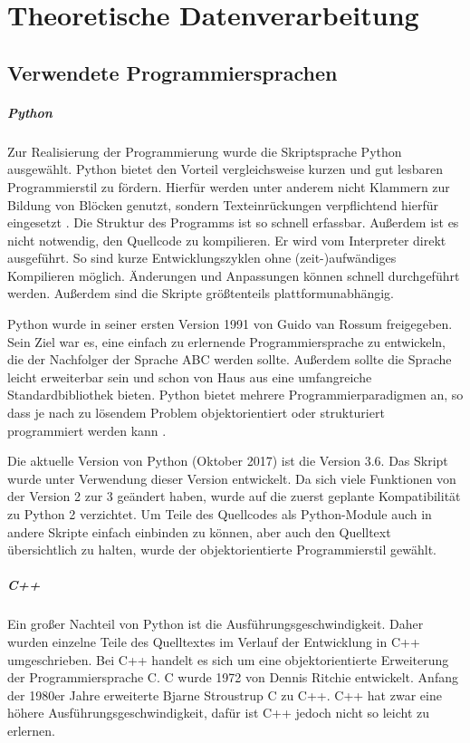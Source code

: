 \documentclass[a4paper,12pt,bibliography=totoc, listof=totoc,titlepage,pointlessnumbers]{scrreprt}
\begin{document}
\chapter{Theoretische Datenverarbeitung}
\label{c:datenverarbeitung}

\section{Verwendete Programmiersprachen}
\paragraph{Python}
Zur Realisierung der Programmierung wurde die Skriptsprache Python ausgewählt. Python bietet den Vorteil vergleichsweise kurzen und gut lesbaren Programmierstil zu fördern. Hierfür werden unter anderem nicht Klammern zur Bildung von Blöcken genutzt, sondern Texteinrückungen verpflichtend hierfür eingesetzt \citep[S. 13f]{python}. Die Struktur des Programms ist so schnell erfassbar. Außerdem ist es nicht notwendig, den Quellcode zu kompilieren. Er wird vom Interpreter direkt ausgeführt. So sind kurze Entwicklungszyklen ohne (zeit-)aufwändiges Kompilieren möglich. Änderungen und Anpassungen können schnell durchgeführt werden. Außerdem sind die Skripte größtenteils plattformunabhängig.

Python wurde in seiner ersten Version 1991 von Guido van Rossum freigegeben. Sein Ziel war es, eine einfach zu erlernende Programmiersprache zu entwickeln, die der Nachfolger der Sprache ABC werden sollte. Außerdem sollte die Sprache leicht erweiterbar sein und schon von Haus aus eine umfangreiche Standardbibliothek bieten. Python bietet mehrere Programmierparadigmen an, so dass je nach zu lösendem Problem objektorientiert oder strukturiert programmiert werden kann \citep[S. 14]{python}.

Die aktuelle Version von Python (Oktober 2017) ist die Version 3.6. Das Skript wurde unter Verwendung dieser Version entwickelt. Da sich viele Funktionen von der Version 2 zur 3 geändert haben, wurde auf die zuerst geplante Kompatibilität zu Python 2 verzichtet. Um Teile des Quellcodes als Python-Module auch in andere Skripte einfach einbinden zu können, aber auch den Quelltext übersichtlich zu halten, wurde der objektorientierte Programmierstil gewählt.

\paragraph{C++}
Ein großer Nachteil von Python ist die Ausführungsgeschwindigkeit. Daher wurden einzelne Teile des Quelltextes im Verlauf der Entwicklung in C++ umgeschrieben.
Bei C++ handelt es sich um eine objektorientierte Erweiterung der Programmiersprache C. C wurde 1972 von Dennis Ritchie entwickelt. Anfang der 1980er Jahre erweiterte Bjarne Stroustrup C zu C++. C++ hat zwar eine höhere Ausführungsgeschwindigkeit, dafür ist C++ jedoch nicht so leicht zu erlernen. \citep[S. 4f]{cpp}
\end{document}
